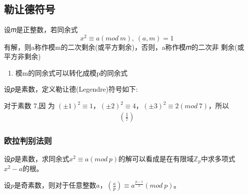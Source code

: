 \documentclass[cn,10pt]{elegantbook}
\begin{document}
\chapter{}
\section{勒让德符号}
\begin{definition}
  设𝑚是正整数，若同余式
  \begin{equation*}
    x^2 \equiv a(mod\ m),\ (a,m) =1
  \end{equation*}
  有解，则a称作模m的二次剩余(或平方剩余)，否则，a称作模𝑚的二次非
剩余(或平方非剩余)
\begin{enumerate}
  \item 模m的同余式可以转化成模p的同余式
\end{enumerate}
\end{definition}
\begin{definition}
  设𝑝是素数，定义勒让德(Legendre)符号如下:
\end{definition}
\begin{example}
  对于素数 7,因 为 $(±1)^2 \equiv 1， (±2)^2 \equiv 4， (±3)^2 \equiv 2(mod\ 7)$，所以\\
  \begin{align*}
    (\frac{1}{7})
  \end{align*}
\end{example}
\subsection{欧拉判别法则}
设𝑝是素数，求同余式$x^2 \equiv a(mod\ p)$的解可以看成是在有限域$\mathbb{Z}_p$中求多项式$x^2 − a$的根。
\begin{theorem}[欧拉判别法则]
设$p$是奇素数，则对于任意整数$a$，$(\frac{a}{p}) \equiv a^{\frac{p-1}{2}}(mod\ p)$。

\end{theorem}
\end{document}
